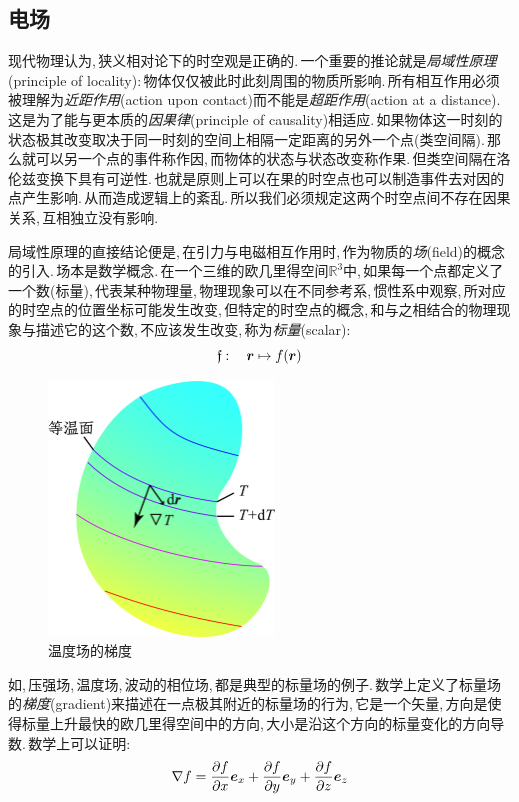 \vspace{1cm}
\subsection{电场}
现代物理认为,\,狭义相对论下的时空观是正确的.\,一个重要的推论就是\emph{局域性原理}(principle of locality):\,物体仅仅被此时此刻周围的物质所影响.\,所有相互作用必须被理解为\emph{近距作用}(action upon contact)而不能是\emph{超距作用}(action at a distance).\,这是为了能与更本质的\emph{因果律}(principle of causality)相适应.\,如果物体这一时刻的状态极其改变取决于同一时刻的空间上相隔一定距离的另外一个点(类空间隔).\,那么就可以另一个点的事件称作因,\,而物体的状态与状态改变称作果.\,但类空间隔在洛伦兹变换下具有可逆性.\,也就是原则上可以在果的时空点也可以制造事件去对因的点产生影响.\,从而造成逻辑上的紊乱.\,所以我们必须规定这两个时空点间不存在因果关系,\,互相独立没有影响.

局域性原理的直接结论便是,\,在引力与电磁相互作用时,\,作为物质的\emph{场}(field)的概念的引入.\,场本是数学概念.\,在一个三维的欧几里得空间\(\mathbb{R}^3\)中,\,如果每一个点都定义了一个数(标量),\,代表某种物理量,\,物理现象可以在不同参考系,\,惯性系中观察,\,所对应的时空点的位置坐标可能发生改变,\,但特定的时空点的概念,\,和与之相结合的物理现象与描述它的这个数,\,不应该发生改变,\,称为\emph{标量}(scalar):
\[\mathfrak{f}:\quad \boldsymbol{r}\mapsto f(\boldsymbol{r})\]
\npg{0cm}
\begin{figure}
\centering
\includegraphics[width=6cm]{image/7-1-3.png}
\caption{温度场的梯度}
\end{figure}
如,\,压强场,\,温度场,\,波动的相位场,\,都是典型的标量场的例子.\,数学上定义了标量场的\emph{梯度}(gradient)来描述在一点极其附近的标量场的行为,\,它是一个矢量,\,方向是使得标量上升最快的欧几里得空间中的方向,\,大小是沿这个方向的标量变化的方向导数.\,数学上可以证明:
\[\nabla f=\frac{\partial f}{\partial x}\boldsymbol{e}_x+\frac{\partial f}{\partial y}\boldsymbol{e}_y+\frac{\partial f}{\partial z}\boldsymbol{e}_z\]

